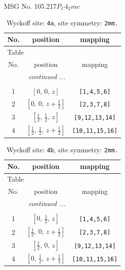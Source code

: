 \documentclass[fleqn,8pt]{jsarticle}
\begin{document}
\setcounter{MaxMatrixCols}{32}

\renewcommand{\tablename}{Table~}
\renewcommand{\figurename}{Figure~}
\begin{center}
\LARGE
MSG No. 105.217\quad$P_{C}4_{2}mc$
\end{center}
\renewcommand{\arraystretch}{1.2}
\begin{longtable}{ccc}
\caption{Wyckoff site: {\tt 4a}, site symmetry: {\tt 2mm.}}
 \\
 \hline \hline
No. & position & mapping \\ \hline \endfirsthead

\multicolumn{2}{l}{\tablename\ \thetable{}} \\
 \hline \hline
No. & position & mapping \\ \hline \endhead

 \hline \hline
\multicolumn{2}{r}{\footnotesize\it continued ...} \\ \endfoot

 \hline \hline
\multicolumn{2}{r}{} \\ \endlastfoot

1 & $\left[ 0,\, 0,\, z \right]$ & {\tt [1,4,5,6]} \\ \hline
2 & $\left[ 0,\, 0,\, z + \frac{1}{2} \right]$ & {\tt [2,3,7,8]} \\ \hline
3 & $\left[ \frac{1}{2},\, \frac{1}{2},\, z \right]$ & {\tt [9,12,13,14]} \\ \hline
4 & $\left[ \frac{1}{2},\, \frac{1}{2},\, z + \frac{1}{2} \right]$ & {\tt [10,11,15,16]} \\
\end{longtable}
\renewcommand{\arraystretch}{1.2}
\begin{longtable}{ccc}
\caption{Wyckoff site: {\tt 4b}, site symmetry: {\tt 2mm.}}
 \\
 \hline \hline
No. & position & mapping \\ \hline \endfirsthead

\multicolumn{2}{l}{\tablename\ \thetable{}} \\
 \hline \hline
No. & position & mapping \\ \hline \endhead

 \hline \hline
\multicolumn{2}{r}{\footnotesize\it continued ...} \\ \endfoot

 \hline \hline
\multicolumn{2}{r}{} \\ \endlastfoot

1 & $\left[ 0,\, \frac{1}{2},\, z \right]$ & {\tt [1,4,5,6]} \\ \hline
2 & $\left[ \frac{1}{2},\, 0,\, z + \frac{1}{2} \right]$ & {\tt [2,3,7,8]} \\ \hline
3 & $\left[ \frac{1}{2},\, 0,\, z \right]$ & {\tt [9,12,13,14]} \\ \hline
4 & $\left[ 0,\, \frac{1}{2},\, z + \frac{1}{2} \right]$ & {\tt [10,11,15,16]} \\
\end{longtable}
\end{document}
